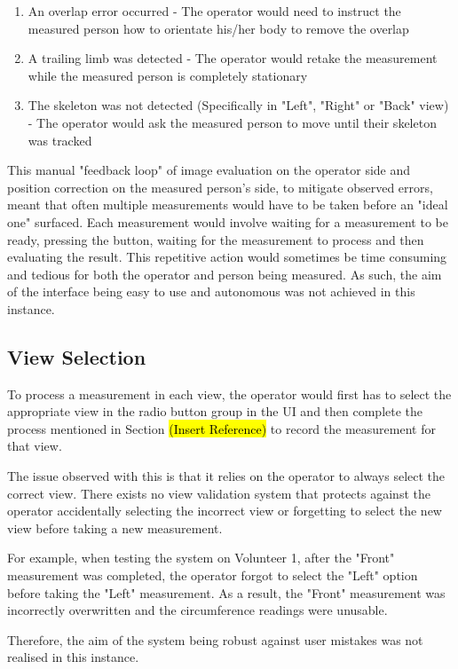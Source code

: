\begin{enumerate}
	\item An overlap error occurred - The operator would need to instruct the measured person how to orientate his/her body to remove the overlap
	\item A trailing limb was detected - The operator would retake the measurement while the measured person is completely stationary
	\item The skeleton was not detected (Specifically in "Left", "Right" or "Back" view) - The operator would ask the measured person to move until their skeleton was tracked 
\end{enumerate}

This manual "feedback loop" of image evaluation on the operator side and position correction on the measured person's side, to mitigate observed errors, meant that often multiple measurements would have to be taken before an "ideal one" surfaced. Each measurement would involve waiting for a measurement to be ready, pressing the button, waiting for the measurement to process and then evaluating the result. This repetitive action would sometimes be time consuming and tedious for both the operator and person being measured.  As such, the aim of the interface being easy to use and autonomous was not achieved in this instance. 

\subsection{View Selection}
To process a measurement in each view, the operator would first has to select the appropriate view in the radio button group in the UI and then complete the process mentioned in Section \hl{(Insert Reference)} to record the measurement for that view. 

The issue observed with this is that it relies on the operator to always select the correct view. There exists no view validation system that protects against the operator accidentally selecting the incorrect view or forgetting to select the new view before taking a new measurement. 

For example, when testing the system on Volunteer 1, after the "Front" measurement was completed, the operator forgot to select the "Left" option before taking the "Left" measurement. As a result, the "Front" measurement was incorrectly overwritten and the circumference readings were unusable.

Therefore, the aim of the system being robust against user mistakes was not realised in this instance.

